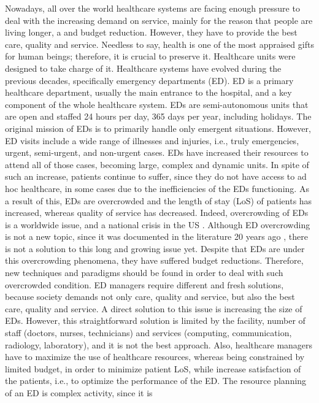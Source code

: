 \documentclass[11pt]{article} %
\begin{document}
Nowadays, all over the world healthcare systems are facing enough pressure to deal with the increasing demand on service, mainly for the reason that people are living longer, a and budget reduction. However, they have to provide the best care, quality and service. Needless to say, health is one of the most appraised gifts for human beings; therefore, it is crucial to preserve it. Healthcare units were designed to 
take charge of it. Healthcare systems have evolved during the previous decades, specifically emergency departments (ED). ED is a 
primary healthcare department, usually the main entrance to the hospital, and a key component of the whole healthcare system. EDs 
are semi-autonomous units that are open and staffed 24 hours per day, 365 days per year, including holidays. The original mission of 
EDs is to primarily handle only emergent situations. However, ED visits include a wide range of illnesses and injuries, i.e., truly 
emergencies, urgent, semi-urgent, and non-urgent cases. EDs have increased their resources to attend all of those cases, becoming large, complex and dynamic units. In spite of such an increase, patients continue to suffer, since they do not have access to ad hoc
healthcare, in some cases due to the inefficiencies of the EDs functioning. As a result of this,  EDs are overcrowded and the length of 
stay (LoS) of patients has increased, whereas quality of service has decreased. Indeed, overcrowding of EDs is a worldwide issue, 
and a national crisis in the US \cite{national2007}. Although ED overcrowding is not a new topic, since it was documented in the 
literature 20 years ago \cite{Lynn1991287}, there is not a solution to this long and growing issue yet. Despite that EDs are under this 
overcrowding phenomena, they have suffered budget reductions. Therefore, new techniques and paradigms should be found  in 
order to deal with such overcrowded condition. ED managers require different and fresh solutions, because society demands not only 
care, quality and service, but also the best care, quality and service. A direct solution to this issue is increasing the size of EDs. 
However, this straightforward solution is limited by the facility, number of staff (doctors, nurses, technicians) and services 
(computing, communication, radiology, laboratory), and it is not the best approach.  Also, healthcare managers have to maximize the 
use of healthcare resources, whereas being constrained by limited budget, in order to minimize patient LoS, while increase 
satisfaction of the patients, i.e., to optimize the performance of the ED. The resource planning of an ED is complex activity, since it is 
\end{document}
